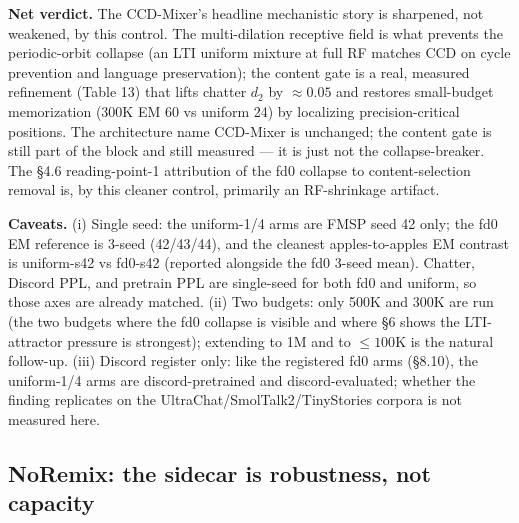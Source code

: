 \documentclass[11pt]{article}
\begin{document}
\textbf{Net verdict.} The CCD-Mixer's headline mechanistic story is sharpened, not weakened, by this control. The multi-dilation receptive field is what prevents the periodic-orbit collapse (an LTI uniform mixture at full RF matches CCD on cycle prevention and language preservation); the content gate is a real, measured refinement (Table 13) that lifts chatter $d_2$ by $\approx 0.05$ and restores small-budget memorization (300K EM 60 vs uniform 24) by localizing precision-critical positions. The architecture name CCD-Mixer is unchanged; the content gate is still part of the block and still measured --- it is just not the collapse-breaker. The \S4.6 reading-point-1 attribution of the fd0 collapse to content-selection removal is, by this cleaner control, primarily an RF-shrinkage artifact.

\textbf{Caveats.} (i) Single seed: the uniform-1/4 arms are FMSP seed 42 only; the fd0 EM reference is 3-seed (42/43/44), and the cleanest apples-to-apples EM contrast is uniform-s42 vs fd0-s42 (reported alongside the fd0 3-seed mean). Chatter, Discord PPL, and pretrain PPL are single-seed for both fd0 and uniform, so those axes are already matched. (ii) Two budgets: only 500K and 300K are run (the two budgets where the fd0 collapse is visible and where \S6 shows the LTI-attractor pressure is strongest); extending to 1M and to $\le 100$K is the natural follow-up. (iii) Discord register only: like the registered fd0 arms (\S8.10), the uniform-1/4 arms are discord-pretrained and discord-evaluated; whether the finding replicates on the UltraChat/SmolTalk2/TinyStories corpora is not measured here.

\subsection{NoRemix: the sidecar is robustness, not capacity}
\end{document}
